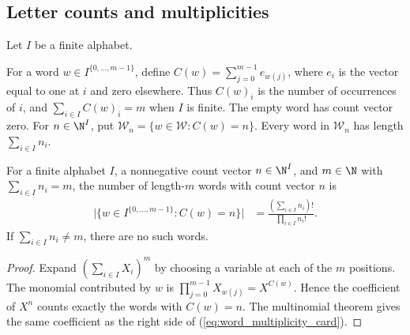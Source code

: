 \subsection{Letter counts and multiplicities}
\label{sec:poisson_word_counts}

Let $I$ be a finite alphabet.

\begin{definition}
\label{def:poisson_word_count_vector}
\leanok
{}
For a word $w\in I^{\{0,\ldots,m-1\}}$, define
$C(w)=\sum_{j=0}^{m-1}e_{w(j)}$, where $e_i$ is the vector equal to one at
$i$ and zero elsewhere. Thus $C(w)_i$ is the number of occurrences of $i$,
and $\sum_{i\in I}C(w)_i=m$ when $I$ is finite.
The empty word has count vector zero.
For $n\in\N^I$, put $\mathcal W_n=\{w\in\mathcal W:C(w)=n\}$.
Every word in $\mathcal W_n$ has length $\sum_{i\in I}n_i$.
\end{definition}

\begin{lemma}
\label{lem:word_multiplicity_card}
\leanok
{}
For a finite alphabet $I$, a nonnegative count vector $n\in\N^I$, and
$m\in\N$ with $\sum_{i\in I}n_i=m$, the number of length-$m$ words
with count vector $n$ is
\begin{align}
 \bigl|\{w\in I^{\{0,\ldots,m-1\}}:C(w)=n\}\bigr|
 &=\frac{(\sum_{i\in I}n_i)!}{\prod_{i\in I}n_i!}.
 \label{eq:word_multiplicity_card}
\end{align}
If $\sum_{i\in I}n_i\ne m$, there are no such words.
\end{lemma}
\begin{proof}
\leanok
Expand $(\sum_{i\in I}X_i)^m$ by choosing a variable at each of the $m$
positions. The monomial contributed by $w$ is
$\prod_{j=0}^{m-1}X_{w(j)}=X^{C(w)}$.
Hence the coefficient of $X^n$ counts exactly the words with $C(w)=n$.
The multinomial theorem gives the same coefficient as the right side
of (\ref{eq:word_multiplicity_card}).
\end{proof}

